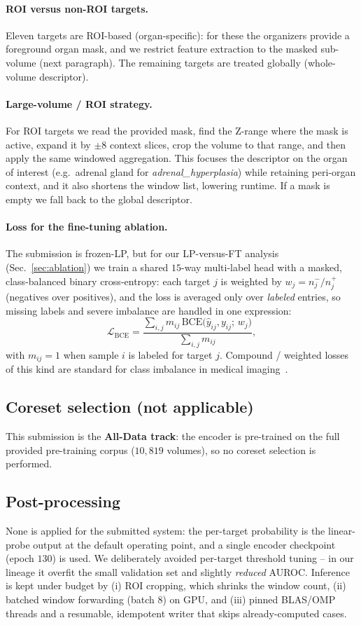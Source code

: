 \documentclass[runningheads]{llncs}
\begin{document}
\paragraph{ROI versus non-ROI targets.}
Eleven targets are ROI-based (organ-specific): for these the organizers provide a
foreground organ mask, and we restrict feature extraction to the masked
sub-volume (next paragraph). The remaining targets are treated globally
(whole-volume descriptor).

\paragraph{Large-volume / ROI strategy.}
For ROI targets we read the provided mask, find the Z-range where the mask is
active, expand it by $\pm 8$ context slices, crop the volume to that range, and
then apply the same windowed aggregation. This focuses the descriptor on the
organ of interest (e.g.\ adrenal gland for \emph{adrenal\_hyperplasia}) while
retaining peri-organ context, and it also shortens the window list, lowering
runtime. If a mask is empty we fall back to the global descriptor.

\paragraph{Loss for the fine-tuning ablation.}
The submission is frozen-LP, but for our LP-versus-FT analysis
(Sec.~\ref{sec:ablation}) we train a shared $15$-way multi-label head with a
masked, class-balanced binary cross-entropy: each target $j$ is weighted by
$w_j = n^-_j / n^+_j$ (negatives over positives), and the loss is averaged only
over \emph{labeled} entries, so missing labels and severe imbalance are handled
in one expression:
\[
\mathcal{L}_{\text{BCE}}
= \frac{\sum_{i,j} m_{ij}\,\text{BCE}\big(\hat{y}_{ij}, y_{ij};\, w_j\big)}
       {\sum_{i,j} m_{ij}} ,
\]
with $m_{ij}\!=\!1$ when sample $i$ is labeled for target $j$. Compound /
weighted losses of this kind are standard for class imbalance in medical
imaging~\cite{LossOdyssey,focal}.

\subsection{Coreset selection (not applicable)}
This submission is the \textbf{All-Data track}: the encoder is pre-trained on the
full provided pre-training corpus ($10{,}819$ volumes), so no coreset selection
is performed.

\subsection{Post-processing}
None is applied for the submitted system: the per-target probability is the
linear-probe output at the default operating point, and a single encoder
checkpoint (epoch $130$) is used. We deliberately avoided per-target threshold
tuning -- in our lineage it overfit the small validation set and slightly
\emph{reduced} AUROC. Inference is kept under budget by (i) ROI cropping, which
shrinks the window count, (ii) batched window forwarding (batch $8$) on GPU, and
(iii) pinned BLAS/OMP threads and a resumable, idempotent writer that skips
already-computed cases.
\end{document}
